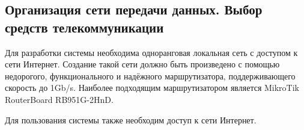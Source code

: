 \subsection{Организация сети передачи данных. Выбор средств телекоммуникации}

Для разработки системы необходима одноранговая локальная сеть с доступом к сети Интернет. Создание такой сети должно быть произведено с помощью недорогого, функционального и надёжного маршрутизатора, поддерживающего скорость до 1Gb/s. Наиболее подходящим маршрутизатором является MikroTik RouterBoard RB951G-2HnD.

Для пользования системы также необходим доступ к сети Интернет.
